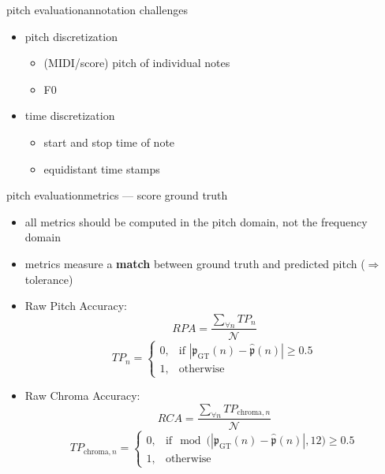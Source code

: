        \begin{frame}{pitch evaluation}{annotation challenges}
            \begin{itemize}
               \item   pitch discretization
                    \begin{itemize}
                        \item   (MIDI/score) pitch of individual notes
                        \item   F0
                    \end{itemize}
               \item   time discretization
                    \begin{itemize}
                        \item   start and stop time of note
                        \item   equidistant time stamps
                    \end{itemize}
            \end{itemize}
            \bigskip
        \end{frame}
       \begin{frame}{pitch evaluation}{metrics --- score ground truth}
            \begin{itemize}
                \item   all metrics should be computed in the pitch domain, not the frequency domain
                \item   metrics measure a \textbf{match} between ground truth and predicted pitch ($\Rightarrow$ tolerance)
                \item<2->   Raw Pitch Accuracy:
                \begin{equation}
                     RPA = \frac{\sum\limits_{\forall n}TP_n}{\mathcal{N}}  
                \end{equation}
                \[ TP_n = \left\{ 
								\begin{array}{ll} 
									0, & \text{if } |\mathfrak{p}_\mathrm{GT}(n) - \hat{\mathfrak{p}}(n)| \geq 0.5 \\
									1, & \text{otherwise }
			          			\end{array} 
			          			\right. \] 
                \item<2->   Raw Chroma Accuracy:
                \begin{equation}
                     RCA = \frac{\sum\limits_{\forall n}TP_{\mathrm{chroma},n}}{\mathcal{N}}  
                \end{equation}
                \[ TP_{\mathrm{chroma},n} = \left\{ 
								\begin{array}{ll} 
									0, & \text{if} \mod\big(|\mathfrak{p}_\mathrm{GT}(n) - \hat{\mathfrak{p}}(n)|, 12\big) \geq 0.5 \\
									1, & \text{otherwise }
			          			\end{array} 
			          			\right. \]
            \end{itemize}
       \end{frame}
